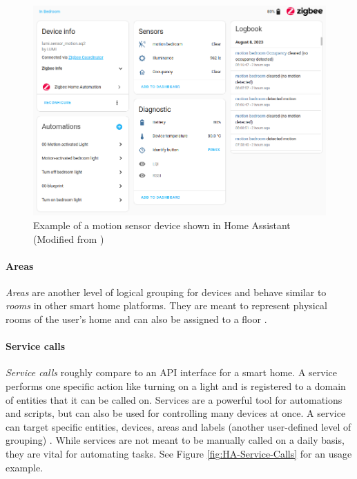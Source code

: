 \begin{figure}[H]
    \centering
    \includegraphics[width=.95\linewidth]{img/ha-device-example.png}
    \caption{Example of a motion sensor device shown in Home Assistant (Modified from \cite{HomeAssistant_Docs_Concepts})}
    \label{fig:HA-Device-Motion-Sensor}
\end{figure}

\paragraph{Areas}
\textit{Areas} are another level of logical grouping for devices and behave similar to \textit{rooms} in other smart home platforms. They are meant to represent physical rooms of the user's home and can also be assigned to a floor \cite{HomeAssistant_Docs_Concepts}.

\paragraph{Service calls}
\textit{Service calls} roughly compare to an API interface for a smart home. A service performs one specific action like turning on a light and is registered to a domain of entities that it can be called on. Services are a powerful tool for automations and scripts, but can also be used for controlling many devices at once. A service can target specific entities, devices, areas and labels (another user-defined level of grouping) \cite{HomeAssistant_Docs_Services}. While services are not meant to be manually called on a daily basis, they are vital for automating tasks. See Figure \ref{fig:HA-Service-Calls} for an usage example.

